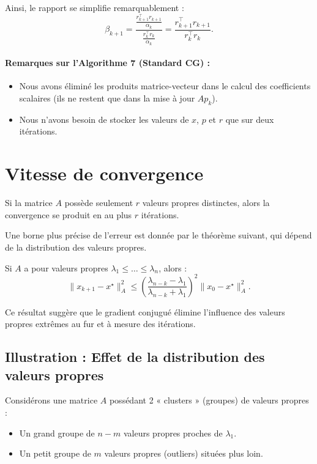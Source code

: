 Ainsi, le rapport se simplifie remarquablement :
\[
\beta_{k+1} = \frac{\frac{r_{k+1}^\top r_{k+1}}{\alpha_k}}{\frac{r_k^\top r_k}{\alpha_k}} = \frac{r_{k+1}^\top r_{k+1}}{r_k^\top r_k}.
\]

\paragraph{Remarques sur l'Algorithme 7 (Standard CG) :}
\begin{itemize}
    \item Nous avons éliminé les produits matrice-vecteur dans le calcul des coefficients scalaires (ils ne restent que dans la mise à jour $Ap_k$).
    \item Nous n'avons besoin de stocker les valeurs de $x$, $p$ et $r$ que sur deux itérations.
\end{itemize}

\section{Vitesse de convergence}

\begin{theoreme}
Si la matrice $A$ possède seulement $r$ valeurs propres distinctes, alors la convergence se produit en au plus $r$ itérations.
\end{theoreme}

Une borne plus précise de l'erreur est donnée par le théorème suivant, qui dépend de la distribution des valeurs propres.

\begin{theoreme}
Si $A$ a pour valeurs propres $\lambda_1 \le \dots \le \lambda_n$, alors :
\[
\| x_{k+1} - x^\star \|_A^2 \le \left( \frac{\lambda_{n-k} - \lambda_1}{\lambda_{n-k} + \lambda_1} \right)^2 \| x_0 - x^\star \|_A^2.
\]
\end{theoreme}
Ce résultat suggère que le gradient conjugué élimine l'influence des valeurs propres extrêmes au fur et à mesure des itérations.

\subsection{Illustration : Effet de la distribution des valeurs propres}

Considérons une matrice $A$ possédant 2 « clusters » (groupes) de valeurs propres :
\begin{itemize}
    \item Un grand groupe de $n-m$ valeurs propres proches de $\lambda_1$.
    \item Un petit groupe de $m$ valeurs propres (outliers) situées plus loin.
\end{itemize}

